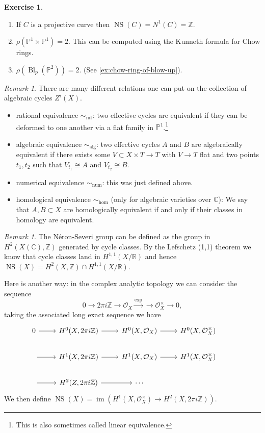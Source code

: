 \documentclass[12pt]{article}
\numberwithin{equation}{section}
\theoremstyle{definition}
\newtheorem{exercise}[theorem]{Exercise}
\theoremstyle{remark}
\newtheorem{remark}[theorem]{Remark}
\newcommand{\RR}{\mathbb{R}}
\newcommand{\CC}{\mathbb{C}}
\newcommand{\ZZ}{\mathbb{Z}}
\newcommand{\Ocal}{\mathcal{O}}
\newcommand{\PP}{\mathbb{P}}
\newcommand{\Bl}{\operatorname{Bl}}
\newcommand{\im}{\operatorname{im}}
\newcommand{\rat}{\operatorname{rat}}
\newcommand{\alg}{\operatorname{alg}}
\newcommand{\num}{\operatorname{num}}
\newcommand{\NS}{\operatorname{NS}}
\begin{document}
\begin{exercise}
	\begin{enumerate}
		\item If $C$ is a projective curve then $\NS(C) = N^1(C)=\ZZ$.
		\item $\rho(\PP^1\times \PP^1)=2$. This can be computed using the Kunneth formula for Chow rings. 
		\item $\rho(\Bl_p(\PP^2))=2$. (See \ref{ex:chow-ring-of-blow-up}).
	\end{enumerate}
\end{exercise}


\begin{remark}
	There are many different relations one can put on the collection of algebraic cycles $Z^i(X)$.
	\begin{itemize}
		\item rational equivalence $\sim_{\rat}$: two effective cycles are equivalent if they can be deformed to one another via a flat family in $\PP^1$.\footnote{This is also sometimes called linear equivalence.}  
		\item algebraic equivalence $\sim_{\alg}$: two effective cycles $A$ and $B$ are algebraically equivalent if there exists some $V \subset X\times T \to T$ with $V\to T$ flat and two points $t_1,t_2$ such that $V_{t_1}\cong A$ and $V_{t_2}\cong B$.
		\item numerical equivalence $\sim_{\num}$: this was just defined above.
		\item homological equivalence $\sim_{\hom}$ (only for algebraic varieties over $\CC$): We say that $A,B \subset X$ are homologically equivalent if and only if their classes in homology are equivalent.
	\end{itemize}
\end{remark}

\begin{remark}
	The N\'eron-Severi group can be defined as the group in $H^2(X(\CC),\ZZ)$ generated by cycle classes. 
	By the Lefschetz (1,1) theorem we know that cycle classes land in $H^{1,1}(X/\RR)$ and hence $\NS(X) = H^2(X,\ZZ)\cap H^{1,1}(X/\RR)$.
	
	Here is another way: in the complex analytic topology we can consider the sequence 
	$$0 \to 2\pi i \ZZ \to \Ocal_X \xrightarrow{\exp} \to \Ocal_X^{\times} \to 0, $$
	taking the associated long exact sequence we have 
	$$\begin{tikzcd}
	0\ar[r] & H^0(X,2\pi i \ZZ) \ar[r] & H^0(X,\Ocal_X) \ar[r] & H^0(X,\Ocal_X^{\times}) &  \\
	\ar[r] &H^1(X,2\pi i \ZZ) \ar[r] & H^1(X,\Ocal_X) \ar[r] & H^1(X,\Ocal_X^{\times}) & \\
	\ar[r] & H^2(Z,2\pi i \ZZ) \ar[r] & \cdots & &
	\end{tikzcd}$$
	We then define $\NS(X) = \im( H^1(X,\Ocal_X^{\times}) \to H^2(X,2\pi i \ZZ) )$.
\end{remark}
\end{document}
